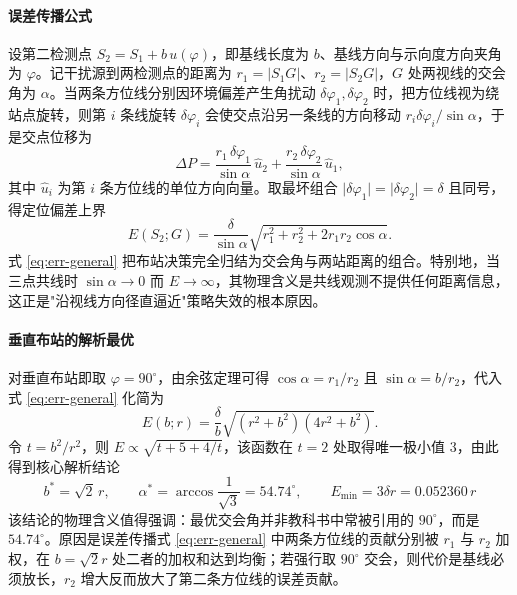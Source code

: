 \paragraph{误差传播公式} 设第二检测点 $S_2=S_1+b\,u(\varphi)$，即基线长度为 $b$、基线方向与示向度方向夹角为 $\varphi$。记干扰源到两检测点的距离为 $r_1=\lvert S_1G\rvert$、$r_2=\lvert S_2G\rvert$，$G$ 处两视线的交会角为 $\alpha$。当两条方位线分别因环境偏差产生角扰动 $\delta\varphi_1,\delta\varphi_2$ 时，把方位线视为绕站点旋转，则第 $i$ 条线旋转 $\delta\varphi_i$ 会使交点沿另一条线的方向移动 $r_i\delta\varphi_i/\sin\alpha$，于是交点位移为
\begin{equation}
\Delta P=\frac{r_1\,\delta\varphi_1}{\sin\alpha}\,\hat u_2+\frac{r_2\,\delta\varphi_2}{\sin\alpha}\,\hat u_1,
\label{eq:err-vec}
\end{equation}
其中 $\hat u_i$ 为第 $i$ 条方位线的单位方向向量。取最坏组合 $\lvert\delta\varphi_1\rvert=\lvert\delta\varphi_2\rvert=\delta$ 且同号，得定位偏差上界
\begin{equation}
E(S_2;G)=\frac{\delta}{\sin\alpha}\sqrt{r_1^2+r_2^2+2r_1r_2\cos\alpha}.
\label{eq:err-general}
\end{equation}
式 \eqref{eq:err-general} 把布站决策完全归结为交会角与两站距离的组合。特别地，当三点共线时 $\sin\alpha\to0$ 而 $E\to\infty$，其物理含义是共线观测不提供任何距离信息，这正是"沿视线方向径直逼近"策略失效的根本原因。

\paragraph{垂直布站的解析最优} 对垂直布站即取 $\varphi=90^\circ$，由余弦定理可得 $\cos\alpha=r_1/r_2$ 且 $\sin\alpha=b/r_2$，代入式 \eqref{eq:err-general} 化简为
\begin{equation}
E(b;r)=\frac{\delta}{b}\sqrt{(r^2+b^2)(4r^2+b^2)} .
\label{eq:err-perp}
\end{equation}
令 $t=b^2/r^2$，则 $E\propto\sqrt{t+5+4/t}$，该函数在 $t=2$ 处取得唯一极小值 $3$，由此得到核心解析结论
\begin{equation}
\boxed{\quad b^{*}=\sqrt2\,r,\qquad
\alpha^{*}=\arccos\frac{1}{\sqrt3}=54.74^\circ,\qquad
E_{\min}=3\delta r=0.052360\,r \quad}
\label{eq:opt-b}
\end{equation}
该结论的物理含义值得强调：最优交会角并非教科书中常被引用的 $90^\circ$，而是 $54.74^\circ$。原因是误差传播式 \eqref{eq:err-general} 中两条方位线的贡献分别被 $r_1$ 与 $r_2$ 加权，在 $b=\sqrt2r$ 处二者的加权和达到均衡；若强行取 $90^\circ$ 交会，则代价是基线必须放长，$r_2$ 增大反而放大了第二条方位线的误差贡献。

